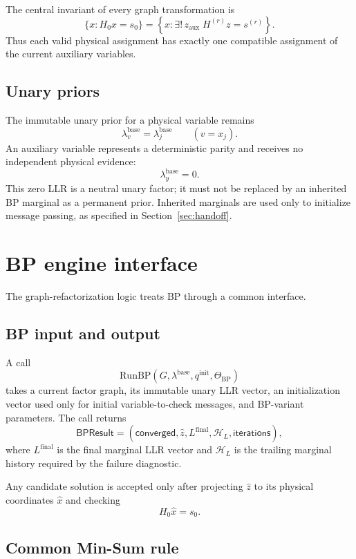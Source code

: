 \documentclass[11pt,a4paper]{article}
\begin{document}
The central invariant of every graph transformation is
\[
\boxed{
\{x:H_0x=s_0\}
=
\left\{
x:\exists!\,z_{\mathrm{aux}}\;
H^{(r)}z=s^{(r)}
\right\}.
}
\]
Thus each valid physical assignment has exactly one compatible assignment of
the current auxiliary variables.

\subsection{Unary priors}

The immutable unary prior for a physical variable remains
\[
\lambda_v^{\mathrm{base}}=\lambda_j^{\mathrm{base}}
\qquad (v=x_j).
\]
An auxiliary variable represents a deterministic parity and receives no
independent physical evidence:
\[
\boxed{
\lambda_y^{\mathrm{base}}=0.
}
\]
This zero LLR is a neutral unary factor; it must not be replaced by an
inherited BP marginal as a permanent prior. Inherited marginals are used only
to initialize message passing, as specified in Section~\ref{sec:handoff}.

\section{BP engine interface}

The graph-refactorization logic treats BP through a common interface.

\subsection{BP input and output}

A call
\[
\mathrm{RunBP}(G,\lambda^{\mathrm{base}},q^{\mathrm{init}},\Theta_{\mathrm{BP}})
\]
takes a current factor graph, its immutable unary LLR vector, an initialization
vector used only for initial variable-to-check messages, and BP-variant
parameters. The call returns
\[
\mathsf{BPResult}
=
(\mathsf{converged},\hat z,L^{\mathrm{final}},
\mathcal H_L,\mathsf{iterations}),
\]
where $L^{\mathrm{final}}$ is the final marginal LLR vector and $\mathcal H_L$
is the trailing marginal history required by the failure diagnostic.

Any candidate solution is accepted only after projecting $\hat z$ to its
physical coordinates $\hat x$ and checking
\[
H_0\hat x=s_0.
\]

\subsection{Common Min-Sum rule}
\end{document}
